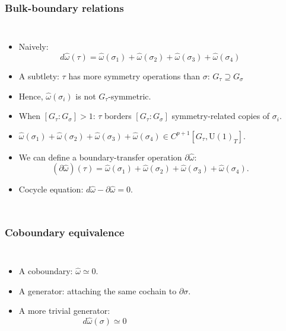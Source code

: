 \documentclass[xcolor=table, 10pt, aspectratio=43]{beamer}
\newcommand{\uone}{\mathrm U(1)}
\begin{document}
\begin{frame}
	\frametitle{Bulk-boundary relations}
	\begin{columns}
		\begin{itemize}
			\item Naively:
			\[d\hat\omega(\tau) = \hat\omega(\sigma_1)
			+\hat\omega(\sigma_2)+\hat\omega(\sigma_3)+\hat\omega(\sigma_4)\]
			\item A subtlety: $\tau$ has more symmetry operations than $\sigma$: $G_\tau \supseteq G_\sigma$
			\item Hence, $\hat\omega(\sigma_i)$ is not $G_\tau$-symmetric.
			\item When $[G_\tau:G_\sigma]>1$: $\tau$ borders $[G_\tau:G_\sigma]$ symmetry-related copies of $\sigma_i$.
			\item $\hat\omega(\sigma_1)
			+\hat\omega(\sigma_2)+\hat\omega(\sigma_3)+\hat\omega(\sigma_4)\in C^{p+1}[G_\tau,\uone_T]$.
			\item We can define a boundary-transfer operation $\partial\hat\omega$:
			\[(\partial\hat\omega)(\tau)=\hat\omega(\sigma_1)
			+\hat\omega(\sigma_2)+\hat\omega(\sigma_3)+\hat\omega(\sigma_4).\]
			\item Cocycle equation: $d\hat\omega - \partial\hat\omega=0.$
		\end{itemize}
	\end{columns}
\end{frame}

\begin{frame}
	\frametitle{Coboundary equivalence}
\begin{columns}
\begin{itemize}
\item A coboundary: $\hat\omega\simeq0$.
\item A generator: attaching the same cochain to  $\partial \sigma$.
\item A more trivial generator:
\[d\hat\omega(\sigma)\simeq0\]
\end{itemize}
\begin{animateinline}{5}
\end{animateinline}
\end{columns}
\end{frame}
\end{document}
